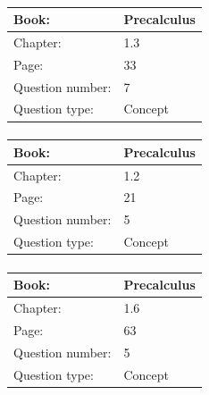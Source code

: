 \documentclass{article}
\begin{document}
            \paragraph{}
            \begin{tabularx}{1\textwidth}{
                    p{}
                    p{}
                }
                \toprule
                Book: & Precalculus
                \\
                \midrule
                Chapter: & 1.3
                \\
                \midrule
                Page: & 33
                \\
                \midrule
                Question number: & 7
                \\
                \midrule
                Question type: & Concept
                \\
                \bottomrule
            \end{tabularx}
            
            \paragraph{}
            \begin{tabularx}{1\textwidth}{
                    p{}
                    p{}
                }
                \toprule
                Book: & Precalculus
                \\
                \midrule
                Chapter: & 1.2
                \\
                \midrule
                Page: & 21
                \\
                \midrule
                Question number: & 5
                \\
                \midrule
                Question type: & Concept
                \\
                \bottomrule
            \end{tabularx}
            
            \paragraph{}
            \begin{tabularx}{1\textwidth}{
                    p{}
                    p{}
                }
                \toprule
                Book: & Precalculus
                \\
                \midrule
                Chapter: & 1.6
                \\
                \midrule
                Page: & 63
                \\
                \midrule
                Question number: & 5
                \\
                \midrule
                Question type: & Concept
                \\
                \bottomrule
            \end{tabularx}
            
\end{document}
